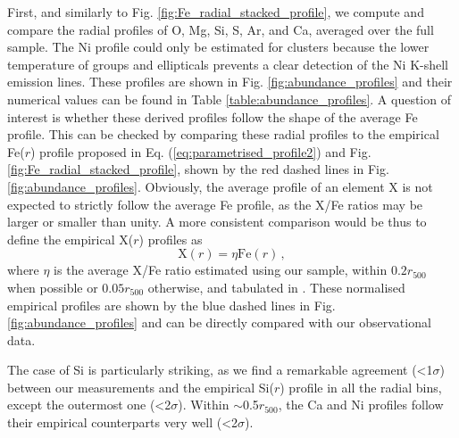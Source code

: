 \documentclass{aa}
\begin{document}
First, and similarly to Fig. \ref{fig:Fe_radial_stacked_profile}, we compute and compare the radial profiles of O, Mg, Si, S, Ar, and Ca, averaged over the full sample. The Ni profile could only be estimated for clusters because the lower temperature of groups and ellipticals prevents a clear detection of the Ni K-shell emission lines. These profiles are shown in Fig. \ref{fig:abundance_profiles} and their numerical values can be found in Table \ref{table:abundance_profiles}. A question of interest is whether these derived profiles follow the shape of the average Fe profile. This can be checked by comparing these radial profiles to the empirical Fe($r$) profile proposed in Eq. (\ref{eq:parametrised_profile2}) and Fig. \ref{fig:Fe_radial_stacked_profile}, shown by the red dashed lines in Fig. \ref{fig:abundance_profiles}. Obviously, the average profile of an element X is not expected to strictly follow the average Fe profile, as the X/Fe ratios may be larger or smaller than unity. A more consistent comparison would be thus to define the empirical X($r$) profiles as 
\begin{equation}
\text{X}(r) = \eta \text{Fe}(r) \, ,
\end{equation}
where $\eta$ is the average X/Fe ratio estimated using our sample, within $0.2 r_{500}$ when possible or $0.05 r_{500}$ otherwise, and tabulated in \citet[][see their Table 2]{2016A&A...592A.157M}. These normalised empirical profiles are shown by the blue dashed lines in Fig. \ref{fig:abundance_profiles} and can be directly compared with our observational data. 

The case of Si is particularly striking, as we find a remarkable agreement (<1$\sigma$) between our measurements and the empirical Si($r$) profile in all the radial bins, except the outermost one (<2$\sigma$). Within $\sim$0.5$r_{500}$, the Ca and Ni profiles follow their empirical counterparts very well (<2$\sigma$).
\end{document}
